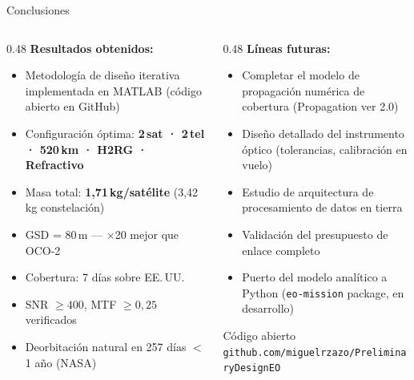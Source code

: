 \documentclass[10pt, aspectratio=169]{beamer}
\begin{document}
\begin{frame}{Conclusiones}
  \begin{columns}[T]
    \begin{column}{0.48\textwidth}
      \textbf{Resultados obtenidos:}
      \begin{itemize}
        \item Metodología de diseño iterativa implementada en
              MATLAB (código abierto en GitHub)
        \item Configuración óptima: \textbf{2\,sat · 2\,tel ·
              520\,km · H2RG · Refractivo}
        \item Masa total: \textbf{1,71\,kg/satélite} (3,42\,kg constelación)
        \item GSD = 80\,m — ×20 mejor que OCO-2
        \item Cobertura: 7 días sobre EE.\,UU.
        \item SNR $\geq 400$, MTF $\geq 0{,}25$ verificados
        \item Deorbitación natural en 257 días $<$ 1 año (NASA)
      \end{itemize}
    \end{column}
    \begin{column}{0.48\textwidth}
      \textbf{Líneas futuras:}
      \begin{itemize}
        \item Completar el modelo de propagación numérica
              de cobertura (Propagation ver 2.0)
        \item Diseño detallado del instrumento óptico
              (tolerancias, calibración en vuelo)
        \item Estudio de arquitectura de procesamiento
              de datos en tierra
        \item Validación del presupuesto de enlace completo
        \item Puerto del modelo analítico a Python
              (\texttt{eo-mission} package, en desarrollo)
      \end{itemize}

      \medskip
      \begin{block}{Código abierto}
        \texttt{\small github.com/miguelrzazo/PreliminaryDesignEO}
      \end{block}
    \end{column}
  \end{columns}
\end{frame}
\end{document}
